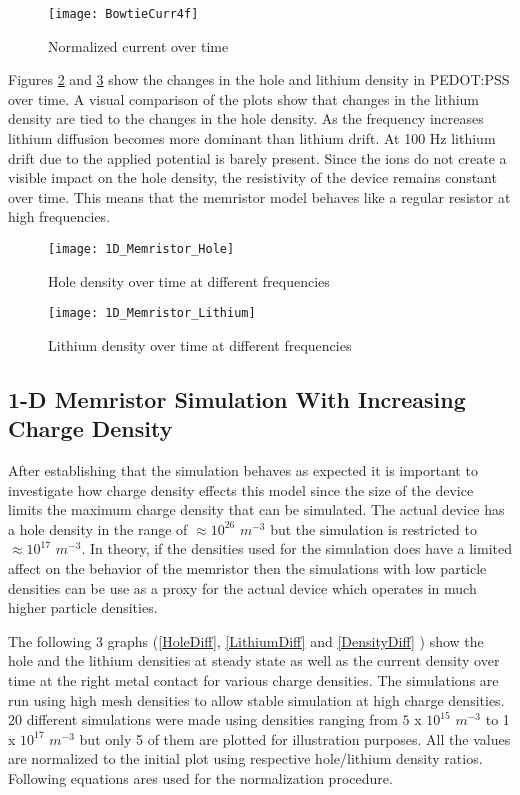 \begin{doublespace}
\begin{figure}[!htp]
\centering
\texttt{[image: BowtieCurr4f]}
\caption{Normalized current over time} 
\label{BowtieCurr}
\end{figure}

Figures \ref{Bowhole} and \ref{Bowli} show the changes in the hole and lithium density in PEDOT:PSS over time. A visual comparison of the plots show that changes in the lithium density are tied to the changes in the hole density. As the frequency increases lithium diffusion becomes more dominant than lithium drift. At 100 Hz lithium drift due to the applied potential is barely present. Since the ions do not create a visible impact on the hole density, the resistivity of the device remains constant over time. This means that the memristor model behaves like a regular resistor at high frequencies.


\begin{figure}[!htp]
\centering
\texttt{[image: 1D\_Memristor\_Hole]}
\caption{Hole density over time at different frequencies} 
\label{Bowhole}
\end{figure}

\begin{figure}[!htp]
\centering
\texttt{[image: 1D\_Memristor\_Lithium]}
\caption{Lithium density over time at different frequencies} 
\label{Bowli}
\end{figure}


\clearpage
\subsection{1-D Memristor Simulation With Increasing Charge Density}

After establishing that the simulation behaves as expected it is important to investigate how charge density effects this model since the size of the device limits the maximum charge density that can be simulated. The actual device has a hole density in the range of $ \approx 10^{26}$ $m^{-3}$ but the simulation is restricted to $\approx 10^{17}$ $m^{-3}$. In theory, if the densities used for the simulation does have a limited affect on the behavior of the memristor then the simulations with low particle densities can be use as a proxy for the actual device which operates in much higher particle densities.

 The following 3 graphs (\ref{HoleDiff}, \ref{LithiumDiff} and \ref{DensityDiff} ) show the hole and the lithium densities at steady state as well as the current density over time at the right metal contact for various charge densities. The simulations are run using high mesh densities to allow stable simulation at high charge densities. 20 different simulations were made using densities ranging from $5$ x $10^{15}$  $m^{-3}$ to 1 x $10^{17}$  $m^{-3}$ but only 5 of them are plotted for illustration purposes. All the values are normalized to the initial plot using respective hole/lithium density ratios. Following equations ares used for the normalization procedure.



\end{doublespace}
